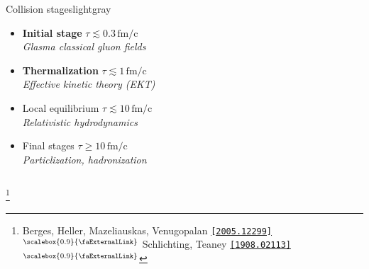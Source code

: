 \documentclass[aspectratio=169,11pt,usenames,dvipsnames]{beamer}
\renewcommand{\thefootnote}{\color{customblue}\faPaperPlaneO}
\newcommand\blfootnote[1]{%
  \begingroup
  \renewcommand\thefootnote{}\footnote{#1}%
  \addtocounter{footnote}{-1}%
  \endgroup
}
\begin{document}
\begin{frame}
\begin{columns}[onlytextwidth,t]
\begin{center}
\begin{custombox2}{\color{normal}Collision stages}{lightgray}
\begin{varwidth}{0.8\textwidth}
\begin{itemize}
                        {\color{lightgray}\scriptsize\itshape Color glass condensate (CGC)}
                    \item {{\bfseries\color{isgold} Initial stage} {\scriptsize $\tau\lesssim
                    0.3\,\mathrm{fm/c}$}}\\[1pt]
                        {\color{lightgray}\scriptsize\itshape Glasma classical gluon fields}
                    \item {\bfseries\color{isgold}Thermalization} {\scriptsize$\tau\lesssim
                    1\,\mathrm{fm/c}$}\\[1pt] 
                        {\color{lightgray}\scriptsize\itshape Effective kinetic theory (EKT)}
                     \item Local equilibrium {\scriptsize $\tau\lesssim 10\,\mathrm{fm/c}$}\\[1pt]
                    {\color{lightgray}\scriptsize\itshape Relativistic hydrodynamics} 
                    \item Final stages {\scriptsize $\tau\geq 10\,\mathrm{fm/c}$}\\[1pt]
                    {\color{lightgray}\scriptsize\itshape Particlization, hadronization}
                \end{itemize}
                \end{varwidth}
            \end{custombox2}
            \end{center}
    \end{columns}
    \blfootnote{\scriptsize Berges, Heller, Mazeliauskas, Venugopalan \href{https://arxiv.org/abs/2005.12299}{{\color{palgold}\texttt{[2005.12299]$^\text{\scalebox{0.9}{\faExternalLink}}$}}} Schlichting, Teaney \href{https://arxiv.org/abs/1908.02113}{{\color{palgold}\texttt{[1908.02113]$^\text{\scalebox{0.9}{\faExternalLink}}$}}}}
\end{frame}
\end{document}

